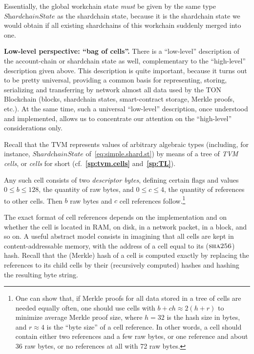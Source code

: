\documentclass[12pt,oneside]{article}
\def\makepoint#1{\medbreak\noindent{\bf #1.\ }}
\def\nxsubpoint{\refstepcounter{subsubsection}%
  \smallbreak\makepoint{\thesubsubsection}}
\def\refpoint#1{{\rm\textbf{\ref{#1}}}}
\let\ptref=\refpoint
\def\embt(#1.){\textbf{#1.}}
\let\tp=\textit
\def\opsc#1{\operatorname{\textsc{#1}}}
\def\Sha{\opsc{sha256}}
\begin{document}
Essentially, the global workchain state {\em must\/} be given by the
same type $\tp{ShardchainState}$ as the shardchain state, because it
is the shardchain state we would obtain if all existing shardchains of
this workchain suddenly merged into one.

\nxsubpoint\label{sp:bag.of.cells} \embt(Low-level perspective: ``bag
of cells''.)  There is a ``low-level'' description of the
account-chain or shardchain state as well, complementary to the
``high-level'' description given above. This description is quite
important, because it turns out to be pretty universal, providing a
common basis for representing, storing, serializing and transferring
by network almost all data used by the TON Blockchain (blocks,
shardchain states, smart-contract storage, Merkle proofs, etc.). At
the same time, such a universal ``low-level'' description, once
understood and implemented, allows us to concentrate our attention on
the ``high-level'' considerations only.

Recall that the TVM represents values of arbitrary algebraic types
(including, for instance, $\tp{ShardchainState}$
of~\eqref{eq:simple.shard.st}) by means of a tree of {\em TVM cells},
or {\em cells\/} for short (cf.~\ptref{sp:tvm.cells}
and~\ptref{sp:TL}).

Any such cell consists of two {\em descriptor bytes}, defining certain
flags and values $0\leq b\leq 128$, the quantity of raw bytes, and
$0\leq c\leq 4$, the quantity of references to other cells. Then $b$
raw bytes and $c$ cell references follow.\footnote{One can show that, if Merkle proofs for all data stored in a tree of cells are needed equally often, one should use cells with $b+ch\approx 2(h+r)$ to minimize average Merkle proof size, where $h=32$ is the hash size in bytes, and $r\approx4$ is the ``byte size'' of a cell reference. In other words, a cell should contain either two references and a few raw bytes, or one reference and about 36 raw bytes, or no references at all with 72 raw bytes.}

The exact format of cell references depends on the implementation and
on whether the cell is located in RAM, on disk, in a network packet,
in a block, and so on. A useful abstract model consists in imagining
that all cells are kept in content-addressable memory, with the
address of a cell equal to its ($\Sha$) hash. Recall that the (Merkle)
hash of a cell is computed exactly by replacing the references to its
child cells by their (recursively computed) hashes and hashing the
resulting byte string.
\end{document}
